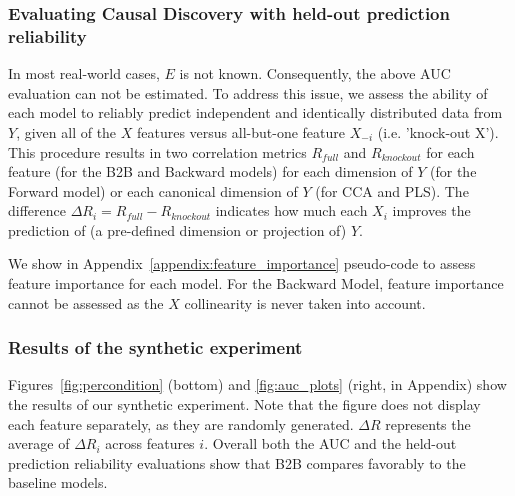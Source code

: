 \subsubsection{Evaluating Causal Discovery with held-out prediction reliability}

In most real-world cases, $E$ is not known. Consequently, the above AUC evaluation can not be estimated.
To address this issue, we assess the ability of each model to reliably predict
independent and identically distributed data from $Y$, given all of the $X$
features versus all-but-one feature $X_{-i}$ (i.e. 'knock-out X'). This
procedure results in two correlation metrics $R_{full}$ and $R_{knockout}$ for
each feature (for the B2B and Backward models) for each dimension of $Y$ (for
the Forward model) or each canonical dimension of $Y$ (for CCA and PLS). The
difference $\Delta R_i = R_{full}-R_{knockout}$ indicates how much each
$X_i$ improves the prediction of (a pre-defined dimension or projection of) $Y$.

We show in Appendix~\ref{appendix:feature_importance} pseudo-code to assess
feature importance for each model. For the Backward Model, feature importance
cannot be assessed as the $X$ collinearity is never
taken into account.

\subsubsection{Results of the synthetic experiment}

Figures~\ref{fig:percondition} (bottom) and \ref{fig:auc_plots} (right, in
Appendix) show the results of our synthetic experiment. Note that the figure
does not display each feature separately, as they are
randomly generated. $\Delta R$ represents the average of $\Delta R_i$ across
features $i$.
Overall both the AUC and the held-out prediction reliability evaluations
show that B2B compares favorably to the baseline models.
